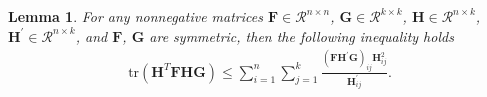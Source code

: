 \documentclass[10pt,journal,compsoc]{IEEEtran}
\newtheorem{lemma}[subsubsection]{Lemma}
\newcommand{\tr}{\mathrm{tr}}
\begin{document}
\appendices

\section{}\label{appendix_A}
\begin{lemma}\label{lemma_ineq}
For any nonnegative matrices $\mathbf{F} \in \mathcal{R}^{n \times n}$, $\mathbf{G} \in \mathcal{R}^{k \times k}$, $\mathbf{H} \in \mathcal{R}^{n \times k}$, $\mathbf{H}^{'} \in \mathcal{R}^{n \times k}$, and $\mathbf{F}$, $\mathbf{G}$ are symmetric, then the following inequality holds
\begin{align}
\tr(\mathbf{H}^T \mathbf{F} \mathbf{H} \mathbf{G}) \leq \sum_{i=1}^{n} \sum_{j=1}^{k} \frac{(\mathbf{F} \mathbf{H}^{'} \mathbf{G})_{ij} \mathbf{H}_{ij}^{2} }{\mathbf{H}_{ij}^{'}}.
\end{align}
\end{lemma}

\end{document}
